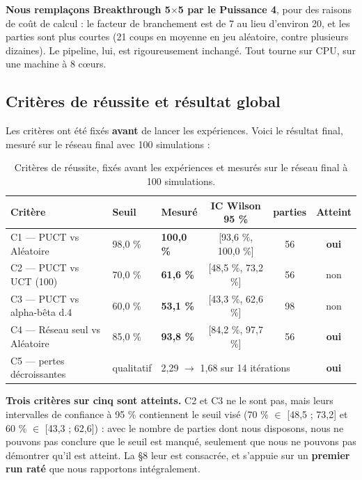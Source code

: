 \documentclass[11pt,a4paper]{article}
\begin{document}
\textbf{Nous remplaçons Breakthrough 5$\times$5 par le Puissance 4}, pour des raisons de coût
de calcul : le facteur de branchement est de 7 au lieu d'environ 20, et les
parties sont plus courtes (21 coups en moyenne en jeu aléatoire, contre plusieurs
dizaines). Le pipeline, lui, est rigoureusement inchangé. Tout tourne sur CPU,
sur une machine à 8 cœurs.

\subsection{Critères de réussite et résultat global}\label{crituxe8res-de-ruxe9ussite-et-ruxe9sultat-global}

Les critères ont été fixés \textbf{avant} de lancer les expériences.
Voici le résultat final, mesuré sur le réseau final avec 100 simulations :

\begin{table}[htbp]
\centering\small
\caption{Critères de réussite, fixés avant les expériences et mesurés sur le réseau final à 100 simulations.}
\label{tab:criteres}
\setlength{\tabcolsep}{4pt}
\begin{tabular}{@{}lllccc@{}}
\toprule
\textbf{Critère} & \textbf{Seuil} & \textbf{Mesuré} & \textbf{IC Wilson 95 \%} & \textbf{parties} & \textbf{Atteint} \\
\midrule
C1 --- PUCT vs Aléatoire & 98,0 \% & \textbf{100,0 \%} & {[}93,6 \%, 100,0 \%{]} & 56 & \textbf{oui} \\
C2 --- PUCT vs UCT (100) & 70,0 \% & \textbf{61,6 \%} & {[}48,5 \%, 73,2 \%{]} & 56 & non \\
C3 --- PUCT vs alpha-bêta d.4 & 60,0 \% & \textbf{53,1 \%} & {[}43,3 \%, 62,6 \%{]} & 98 & non \\
C4 --- Réseau seul vs Aléatoire & 85,0 \% & \textbf{93,8 \%} & {[}84,2 \%, 97,7 \%{]} & 56 & \textbf{oui} \\
C5 --- pertes décroissantes & qualitatif & \multicolumn{3}{l}{2,29 $\rightarrow$ 1,68 sur 14 itérations} & \textbf{oui} \\
\bottomrule
\end{tabular}
\end{table}

\textbf{Trois critères sur cinq sont atteints.} C2 et C3 ne le sont pas, mais leurs
intervalles de confiance à 95 \% contiennent le seuil visé (70 \% $\in$ {[}48,5 ; 73,2{]} et
60 \% $\in$ {[}43,3 ; 62,6{]}) : avec le nombre de parties dont nous disposons, nous ne
pouvons pas conclure que le seuil est manqué, seulement que nous ne pouvons pas
démontrer qu'il est atteint. La §8 leur est consacrée, et s'appuie sur un
\textbf{premier run raté} que nous rapportons intégralement.
\end{document}
